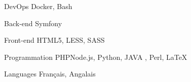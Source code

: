 

\begin{cvskills}

  \cvskill
    {DevOps} %
    {Docker, Bash} %

  \cvskill
    {Back-end} %
    {Symfony} %

  \cvskill
    {Front-end} %
    {HTML5, LESS, SASS} %

  \cvskill
    {Programmation} %
    {PHPNode.js, Python, JAVA , Perl, LaTeX} %

  \cvskill
    {Languages} %
    {Français, Angalais} %

\end{cvskills}
